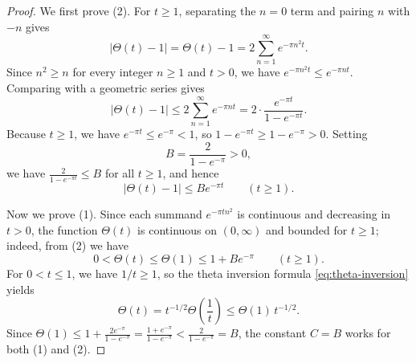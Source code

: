 \documentclass[11pt]{article}
\theoremstyle{plain}
\theoremstyle{definition}
\theoremstyle{boldremark}
\theoremstyle{remark}
\numberwithin{equation}{section}
\begin{document}
\begin{proof}
We first prove (2). For $t\geq 1$, separating the $n=0$ term and pairing
$n$ with $-n$ gives
\[
 |\Theta(t)-1| = \Theta(t)-1 = 2\sum_{n=1}^{\infty} e^{-\pi n^2 t}.
\]
Since $n^2\geq n$ for every integer $n\geq 1$ and $t>0$, we have
$e^{-\pi n^2 t}\leq e^{-\pi n t}$. Comparing with a geometric series gives
\[
 |\Theta(t)-1|
 \leq 2\sum_{n=1}^{\infty} e^{-\pi n t}
 = 2\cdot\frac{e^{-\pi t}}{1-e^{-\pi t}}.
\]
Because $t\geq 1$, we have $e^{-\pi t}\leq e^{-\pi}<1$, so
$1-e^{-\pi t}\geq 1-e^{-\pi}>0$. Setting
\[
 B = \frac{2}{1-e^{-\pi}} > 0,
\]
we have $\frac{2}{1-e^{-\pi t}}\leq B$ for all $t\geq 1$, and hence
\[
 |\Theta(t)-1| \leq B e^{-\pi t} \qquad (t\geq 1).
\]

Now we prove (1). Since each summand $e^{-\pi t n^2}$ is continuous and
decreasing in $t>0$, the function $\Theta(t)$ is continuous on $(0,\infty)$
and bounded for $t\geq 1$; indeed, from (2) we have
\[
 0 < \Theta(t) \leq \Theta(1) \leq 1 + B e^{-\pi} \qquad (t\geq 1).
\]
For $0<t\leq 1$, we have $1/t\geq 1$, so the theta inversion formula
\eqref{eq:theta-inversion} yields
\[
 \Theta(t) = t^{-1/2}\Theta\!\left(\frac{1}{t}\right)
 \leq \Theta(1)\,t^{-1/2}.
\]
Since $\Theta(1)\leq 1+\frac{2e^{-\pi}}{1-e^{-\pi}}=\frac{1+e^{-\pi}}{1-e^{-\pi}}<\frac{2}{1-e^{-\pi}}=B$,
the constant $C=B$ works for both (1) and (2).
\end{proof}
\end{document}

